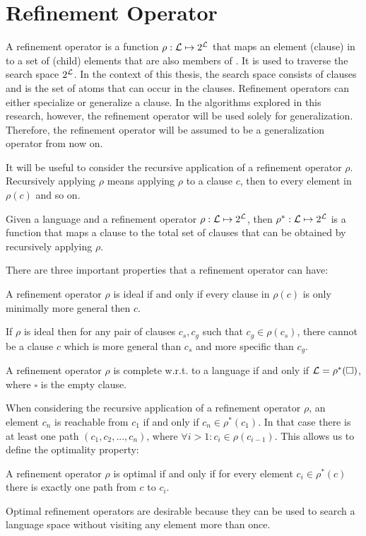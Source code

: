 \section{Refinement Operator}
\label{sec:bg_ref_op}
A refinement operator is a function $\rho : \mathcal{L} \mapsto 2^{\mathcal{L}}$ that maps an element (clause) in  to a set of (child) elements that are also members of . It is used to traverse the search space $2^{\mathcal{L}}$. In the context of this thesis, the search space consists of clauses and  is the set of atoms that can occur in the clauses. Refinement operators can either specialize or generalize a clause. In the algorithms explored in this research, however, the refinement operator will be used solely for generalization. Therefore, the refinement operator will be assumed to be a generalization operator from now on.

It will be useful to consider the recursive application of a refinement operator $\rho$. Recursively applying $\rho$ means applying $\rho$ to a clause $c$, then to every element in $\rho(c)$ and so on.
\begin{definition}
Given a language  and a refinement operator $\rho: \mathcal{L} \mapsto 2^{\mathcal{L}}$, then $\rho^* : \mathcal{L} \mapsto 2^{\mathcal{L}}$ is a function that maps a clause to the total set of clauses that can be obtained by recursively applying $\rho$.
\end{definition}
There are three important properties that a refinement operator can have:
\begin{definition}
A refinement operator $\rho$ is ideal if and only if every clause in $\rho(c)$ is only minimally more general then $c$.
\end{definition}
If $\rho$ is ideal then for any pair of clauses $c_s, c_g$ such that $c_g \in \rho(c_s)$, there cannot be a clause $c$ which is more general than $c_s$ and more specific than $c_g$.
\begin{definition}
A refinement operator $\rho$ is complete w.r.t. to a language  if and only if $\mathcal{L} = \rho^*(\square)$, where $\square$ is the empty clause.
\end{definition}
When considering the recursive application of a refinement operator $\rho$, an element $c_n$ is reachable from $c_1$ if and only if $c_n \in \rho^*(c_1)$. In that case there is at least one path $(c_1, c_2, ..., c_n)$, where $\forall i > 1: c_i \in \rho(c_{i-1})$. This allows us to define the optimality property:
\begin{definition}
A refinement operator $\rho$ is optimal if and only if for every element $c_i \in \rho^*(c)$ there is exactly one path from $c$ to $c_i$.
\end{definition}
Optimal refinement operators are desirable because they can be used to search a language space  without visiting any element more than once.

